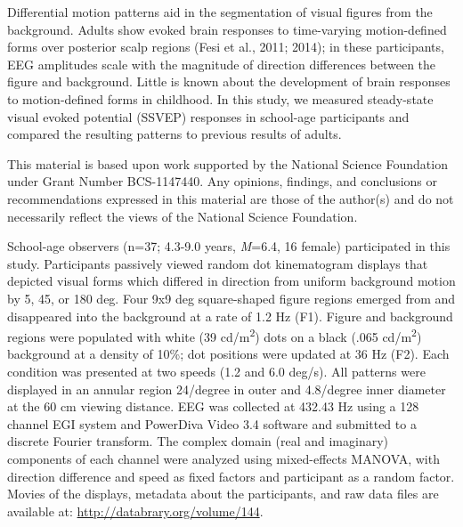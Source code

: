 \documentclass[landscape,final,paperwidth=72in,paperheight=42in,fontscale=0.285]{baposter}
\begin{document}
\begin{poster}
    {
      Differential motion patterns aid in the segmentation of visual figures from the background. 
Adults show evoked brain responses to time-varying motion-defined forms over posterior scalp regions (Fesi et al., 2011; 2014); in these participants, EEG amplitudes scale with the magnitude of direction differences between the figure and background.
      Little is known about the development of brain responses to motion-defined forms in childhood. In this study, we measured steady-state visual evoked potential (SSVEP) responses in school-age participants and compared the resulting patterns to previous results of adults.    
    }

    {
      This material is based upon work supported by the National Science Foundation under Grant Number BCS-1147440. Any opinions, findings, and conclusions or recommendations expressed in this material are those of the author(s) and do not necessarily reflect the views of the National Science Foundation.  
    }

    {
      School-age observers (n=37; 4.3-9.0 years, \emph{M}=6.4, 16 female) participated in this study.  
      Participants passively viewed random dot kinematogram displays that depicted visual forms which differed in direction from uniform background motion by 5, 45, or 180 deg. Four 9x9 deg square-shaped figure regions emerged from and disappeared into the background at a rate of 1.2 Hz (F1). Figure and background regions were populated with white (39 cd/m\textsuperscript{2}) dots on a black (.065 cd/m\textsuperscript{2}) background at a density of 10\%; dot positions were updated at 36 Hz (F2). Each condition was presented at two speeds (1.2 and 6.0 deg/s). All patterns were displayed in an annular region 24/degree in outer and 4.8/degree inner diameter at the 60 cm viewing distance.  
      EEG was collected at 432.43 Hz using a 128 channel EGI system and PowerDiva Video 3.4 software and submitted to a discrete Fourier transform. 
      The complex domain (real and imaginary) components of each channel were analyzed using mixed-effects MANOVA, with direction difference and speed as fixed factors and participant as a random factor.  
      }
    {
       Movies of the displays, metadata about the participants, and raw data files are available at: \url{http://databrary.org/volume/144}.
     }


\end{poster}
\end{document}
